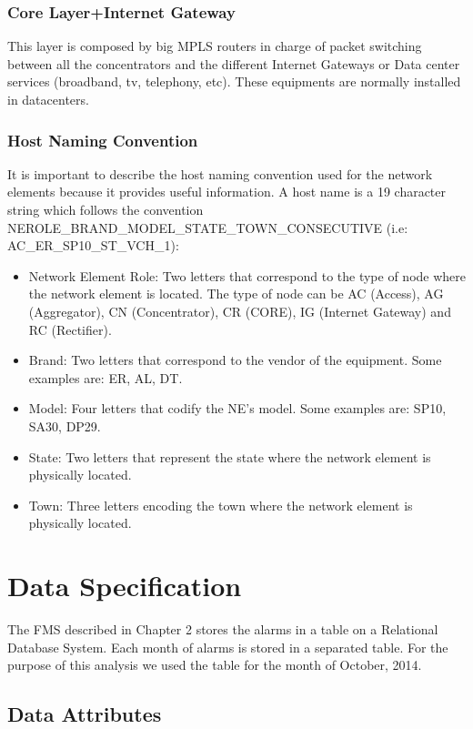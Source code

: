 \documentclass[10pt,a4paper]{report}
\begin{document}
\subsection{Core Layer+Internet Gateway}
This layer is composed by big MPLS routers in charge of packet switching between all the concentrators and the different Internet Gateways or Data center services (broadband, tv, telephony, etc). These equipments are normally installed in datacenters.

\subsection{Host Naming Convention}
It is important to describe the host naming convention used for the network elements because it provides useful information. A host name is a 19 character string which follows the convention NEROLE\_BRAND\_MODEL\_STATE\_TOWN\_CONSECUTIVE (i.e: AC\_ER\_SP10\_ST\_VCH\_1):

\begin{itemize}
   \item Network Element Role: Two letters that correspond to the type of node where the network element is located. The type of node can be AC (Access), AG (Aggregator), CN (Concentrator), CR (CORE), IG (Internet Gateway) and RC (Rectifier).
   \item Brand: Two letters that correspond to the vendor of the equipment. Some examples are: ER, AL, DT.
   \item Model: Four letters that codify the NE's model. Some examples are: SP10, SA30, DP29.
   \item State: Two letters that represent the state where the network element is physically located.
   \item Town: Three letters encoding the town where the network element is physically located.
\end{itemize}

 
\chapter{Data Specification}

The FMS described in Chapter 2 stores the alarms in a table on a Relational Database System. Each month of alarms is stored in a separated table. For the purpose of this analysis we used the table for the month of October, 2014.

\section{Data Attributes}
\end{document}
